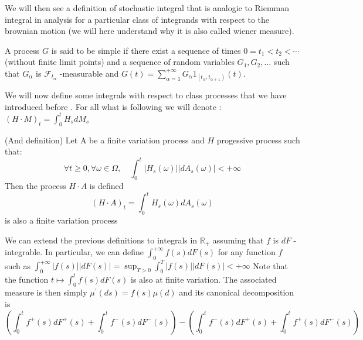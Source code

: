 	We will then see a definition of stochastic integral that is analogic to Riemman integral in analysis for a particular class of integrands with respect to the brownian motion (we will here understand why it is also called wiener measure).

	\begin{definition}
		A process $G$ is said to be simple if there exist a sequence of times $0=t_{1}<t_{2}<\cdots$ (without finite limit points) and a sequence of random variables $G_{1}, G_{2}, \ldots$ such that $G_{\alpha}$ is $\mathcal{F}_{t_{\alpha}}$ -measurable and $G(t)=\sum_{\alpha=1}^{+\infty} G_{\alpha} 1_{\left[t_{\alpha}, t_{\alpha+1}\right)}(t) .$
	\end{definition}

	We will now define some integrals with respect to class processes that we have introduced before . For all what is following we will denote :$(H \cdot M)_{t}=\int_{0}^{t} H_{s} d M_{s}$

	\begin{proposition}
		(And definition) Let A be a finite variation process and $H$ progessive process such that:
		$$
		\forall t \geq 0, \forall \omega \in \Omega, \quad \int_{0}^{t}\left|H_{s}(\omega)\right|\left|d A_{s}(\omega)\right|<+\infty
		$$
		Then the process $H \cdot A$ is defined
		$$
		(H \cdot A)_{t}=\int_{0}^{t} H_{s}(\omega) d A_{s}(\omega)
		$$
		is also a finite variation process
	\end{proposition}

	We can extend the previous definitions to integrals in $\mathbb{R}_{+}$ assuming that $ f  $ is $ d F $ -integrable. In particular, we can define $ \int_ {0} ^{+\infty} f(s) dF(s)$ for any function $ f $ such as $\int_{0}^{+\infty}|f (s)||dF(s)| = \sup_{T> 0}\int_ {0}^{T} |f(s)||dF(s)|<+\infty $
	Note that the function $t\mapsto \int_{0}^{t}f(s)dF(s)$ is also at finite variation. The associated measure is then simply $\mu^{\prime}(d s)=f(s)\mu(d)$ and its canonical decomposition is
	$$
	\left(\int_{0}^{t} f^{+}(s) d F^{+}(s)+\int_{0}^{t} f^{-}(s) d F^{-}(s)\right)-\left(\int_{0}^{t} f^{-}(s) d F^{+}(s)+\int_{0}^{t} f^{+}(s) d F^{-}(s)\right)
	$$

